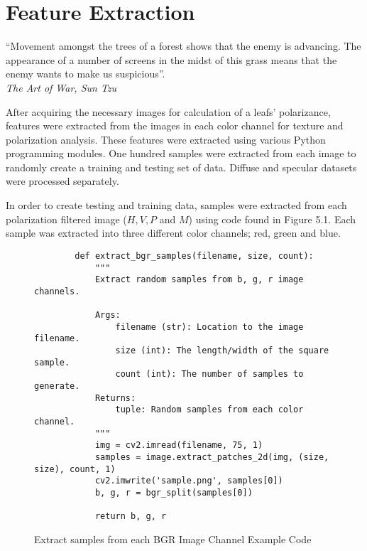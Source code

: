 \chapter{Feature Extraction}
\begin{center}
  \begin{minipage}{0.75\textwidth}
    \begin{small}
      “Movement amongst the trees of a forest shows that the enemy is advancing.  The appearance of a number of screens in the midst of this grass means that the enemy wants to make us suspicious”.\\
      \null\hfill\emph{The Art of War, Sun Tzu}
    \end{small}
  \end{minipage}
  \vspace{0.5cm}
\end{center}

After acquiring the necessary images for calculation of a leafs' polarizance, features were extracted from the images in each color channel for texture and polarization analysis.  These features were extracted using various Python programming modules. One hundred samples were extracted from each image to randomly create a training and testing set of data.  Diffuse and specular datasets were processed separately.

In order to create testing and training data, samples were extracted from each polarization filtered image ($H, V, P$ and $M$) using code found in Figure 5.1.  Each sample was extracted into three different color channels; red, green and blue.

\begin{figure}
    \begin{lstlisting}
        def extract_bgr_samples(filename, size, count):
            """
            Extract random samples from b, g, r image channels.

            Args:
                filename (str): Location to the image filename.
                size (int): The length/width of the square sample.
                count (int): The number of samples to generate.
            Returns:
                tuple: Random samples from each color channel.
            """
            img = cv2.imread(filename, 75, 1)
            samples = image.extract_patches_2d(img, (size, size), count, 1)
            cv2.imwrite('sample.png', samples[0])
            b, g, r = bgr_split(samples[0])

            return b, g, r
    \end{lstlisting}
    \caption{Extract samples from each BGR Image Channel Example Code}
    \label{fig:scattering}
\end{figure}

